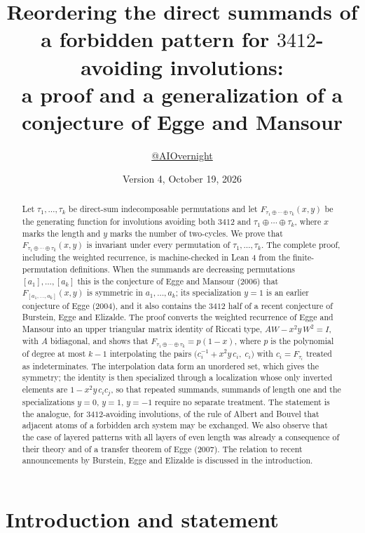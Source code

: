 \documentclass[11pt]{amsart}
\title[Direct summands of forbidden patterns for 3412-avoiding involutions]{Reordering the direct summands of a forbidden pattern for $3412$-avoiding involutions:\\ a proof and a generalization of a conjecture of Egge and Mansour}
\author{\href{https://x.com/AIOvernight}{@AIOvernight}}
\date{Version 4, October 19, 2026}
\theoremstyle{definition}
\begin{document}
\begin{abstract}
Let $\tau_1,\dots,\tau_k$ be direct-sum indecomposable permutations and let $F_{\tau_1\oplus\cdots\oplus\tau_k}(x,y)$ be the generating function for involutions avoiding both $3412$ and $\tau_1\oplus\cdots\oplus\tau_k$, where $x$ marks the length and $y$ marks the number of two-cycles. We prove that $F_{\tau_1\oplus\cdots\oplus\tau_k}(x,y)$ is invariant under every permutation of $\tau_1,\dots,\tau_k$. The complete proof, including the weighted recurrence, is machine-checked in Lean 4 from the finite-permutation definitions. When the summands are decreasing permutations $[a_1],\dots,[a_k]$ this is the conjecture of Egge and Mansour (2006) that $F_{[a_1,\dots,a_k]}(x,y)$ is symmetric in $a_1,\dots,a_k$; its specialization $y=1$ is an earlier conjecture of Egge (2004), and it also contains the $3412$ half of a recent conjecture of Burstein, Egge and Elizalde. The proof converts the weighted recurrence of Egge and Mansour into an upper triangular matrix identity of Riccati type, $AW-x^2y\,W^2=I$, with $A$ bidiagonal, and shows that $F_{\tau_1\oplus\cdots\oplus\tau_k}=p(1-x)$, where $p$ is the polynomial of degree at most $k-1$ interpolating the pairs $\bigl(c_i^{-1}+x^2y\,c_i,\;c_i\bigr)$ with $c_i=F_{\tau_i}$ treated as indeterminates. The interpolation data form an unordered set, which gives the symmetry; the identity is then specialized through a localization whose only inverted elements are $1-x^2y\,c_ic_j$, so that repeated summands, summands of length one and the specializations $y=0$, $y=1$, $y=-1$ require no separate treatment. The statement is the analogue, for $3412$-avoiding involutions, of the rule of Albert and Bouvel that adjacent atoms of a forbidden arch system may be exchanged. We also observe that the case of layered patterns with all layers of even length was already a consequence of their theory and of a transfer theorem of Egge (2007). The relation to recent announcements by Burstein, Egge and Elizalde is discussed in the introduction.
\end{abstract}

\maketitle

\section{Introduction and statement}
\end{document}
